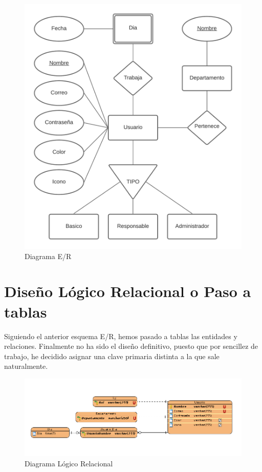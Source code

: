 \documentclass[11pt,spanish,listoffigures,listoftables]{tfgetsinf}
\begin{document}
\begin{figure}[h!] %
  \centering
   \includegraphics[scale=0.80]{img/EntidadRelacion.png}
   \caption{Diagrama E/R}
   \label{fig:diagramaer}
 \end{figure}

\section{Diseño Lógico Relacional o Paso a tablas}
Siguiendo el anterior esquema E/R, hemos pasado a tablas las entidades y relaciones.
Finalmente no ha sido el diseño definitivo, puesto que por sencillez de trabajo, he decidido asignar una clave primaria distinta a la que sale naturalmente.

\begin{figure}[h!] %
  \includegraphics[width=\linewidth]{img/pasotablas.png}
  \caption{Diagrama Lógico Relacional}
  \label{fig:diagramalr}
\end{figure}
\end{document}
